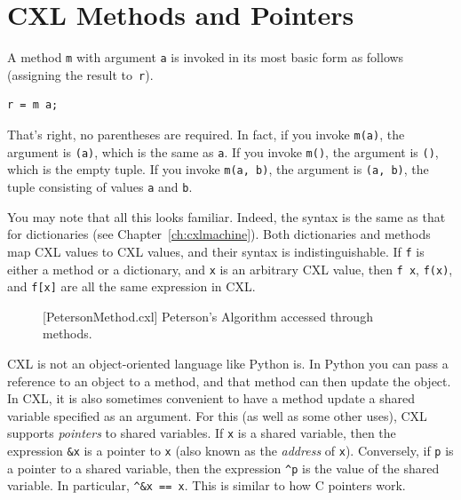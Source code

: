 \documentclass{report}
\newenvironment{code}{
\tcolorbox
}{
\endtcolorbox
}
\begin{document}
\chapter{CXL Methods and Pointers}
\label{ch:method}

A method \texttt{m} with argument \texttt{a} is invoked in its
most basic form as follows (assigning the result to~\texttt{r}).
\begin{code}
\begin{verbatim}
r = m a;
\end{verbatim}
\end{code}
That's right, no parentheses are required.  In fact, if you invoke
\texttt{m(a)}, the argument is \texttt{(a)}, which is the same
as \texttt{a}.
If you invoke \texttt{m()}, the argument is \texttt{()},
which is the empty tuple.
If you invoke \texttt{m(a, b)}, the argument is \texttt{(a, b)},
the tuple consisting of values \texttt{a} and \texttt{b}.

You may note that all this looks familiar.  Indeed, the syntax
is the same as that for dictionaries (see Chapter~\ref{ch:cxlmachine}).
Both dictionaries and methods map CXL values to CXL values,
and their syntax is indistinguishable.
If \texttt{f} is either a method or a
dictionary, and \texttt{x} is an arbitrary CXL value, then
\texttt{f x}, \texttt{f(x)}, and \texttt{f[x]} are all
the same expression in CXL.

\begin{figure}
\begin{code}
\end{code}
\caption{[PetersonMethod.cxl] Peterson's Algorithm accessed through methods.}
\label{fig:petersonmethods}
\end{figure}

CXL is not an object-oriented language like Python is.  In Python
you can pass a reference to an object to a method, and that method
can then update the object.  In CXL, it is also sometimes convenient
to have a method update a shared variable specified as an argument.
For this (as well as some other uses), CXL supports \emph{pointers}
to shared variables.
If \texttt{x} is a shared variable, then the expression \texttt{\&x}
 is a pointer to \texttt{x} (also known as the \emph{address}
of \texttt{x}).
Conversely, if \texttt{p} is a pointer to a shared variable, then the
expression \texttt{\^{}p} is the value of the shared variable.
In particular, \texttt{\^{}\&x == x}.
This is similar to how C pointers work.
\end{document}
